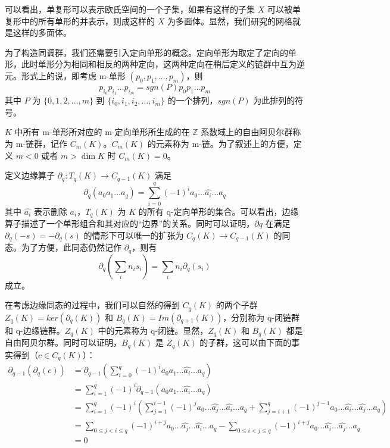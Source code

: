 可以看出，单复形可以表示欧氏空间的一个子集，如果有这样的子集 $ X $ 可以被单复形中的所有单形的并表示，则成这样的 $ X $ 为多面体。显然，我们研究的网格就是这样的多面体。

为了构造同调群，我们还需要引入定向单形的概念。定向单形为取定了定向的单形，此时单形分为相同和相反的两种定向，这两种定向在稍后定义的链群中互为逆元。形式上的说，即考虑 m-单形 $ (p_0, p_1, \dots, p_m) $，则 
$$ p_{i_0} p_{i_1} \dots p_{i_m} = sgn(P) p_{0} p_{1} \dots p_{m} $$
其中 $ P $ 为 $ \{0, 1, 2, \dots, m \} $ 到 $ \{i_0, i_1, i_2, \dots, i_m \} $ 的一个排列，$ sgn(P) $ 为此排列的符号。

$ K $ 中所有 m-单形所对应的 m-定向单形所生成的在 $ \mathbb{Z} $ 系数域上的自由阿贝尔群称为 m-链群，记作 $ C_m(K) $。$ C_m(K) $ 的元素称为 m-链。为了叙述上的方便，定义 $ m < 0 $ 或者 $ m > \dim K $ 时 $ C_m(K) = 0 $。

定义边缘算子 $ \partial_q: T_q(K) \to C_{q-1}(K) $ 满足 
$$ \partial_q (a_0 a_1 \dots a_q) = \sum_{i=0}^{q} (-1)^i a_0 \dots \hat{a_i} \dots a_q $$
其中  $ \hat{a_i} $ 表示删除 $ a_i $，$ T_q(K) $ 为 $ K $ 的所有 q-定向单形的集合。可以看出，边缘算子描述了一个单形组合和其对应的“边界”的关系。同时可以证明，$ \partial q $ 在满足 $\partial_q(-s) = -\partial_q(s) $ 的情形下可以唯一的扩张为 $ C_q(K) \to C_{q-1}(K) $ 的同态。为了方便，此同态仍然记作 $ \partial_q $，则有
$$
\partial_q (\sum_i n_i s_i) = \sum_i n_i \partial_q (s_i)
$$
成立。

在考虑边缘同态的过程中，我们可以自然的得到 $ C_q(K) $ 的两个子群 $ Z_q(K) = ker(\partial_q(K)) $ 和 $ B_q(K) = Im(\partial_{q+1}(K)) $，分别称为 q-闭链群和 q-边缘链群。$ Z_q(K) $ 中的元素称为 q-闭链。显然，$ Z_q(K) $ 和 $ B_q(K) $ 都是自由阿贝尔群。同时可以证明，$ B_q(K) $ 是 $ Z_q(K) $ 的子群，这可以由下面的事实得到（$ c \in C_q(K) $）：
\begin{align*}
\partial_{q-1} (\partial_q (c)) &= \partial_{q-1} (\sum_{i=0}^q (-1)^i a_0 a_1 \dots \hat{a_i} \dots a_q) \\
&= \sum_{i=1}^q (-1)^i \partial_{q-1} (a_0 a_1 \dots \hat{a_i} \dots a_q) \\
&= \sum_{i=1}^q (-1)^i ( \sum_{j=1}^{i-1} (-1)^j a_0 \dots \hat{a_j} \dots \hat{a_i} \dots a_q + \sum_{j=i+1}^{q} (-1)^{j-1} a_0 \dots \hat{a_i} \dots \hat{a_j} \dots a_q ) \\
&= \sum_{0 \le j < i \le q} (-1)^{i+j} a_0 \dots \hat{a_j} \dots \hat{a_i} \dots a_q - \sum_{0 \le i < j \le q} (-1)^{i+j} a_0 \dots \hat{a_i} \dots \hat{a_j} \dots a_q \\
&= 0
\end{align*}

